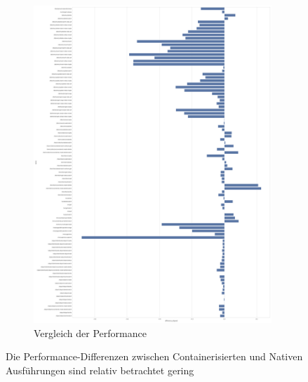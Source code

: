 \begin{figure}[h!]
    \centering
    \includegraphics[width=0.8\textwidth]{benchmark/vis/differences/difference_elapsed.png}
    \caption{Vergleich der Performance}
    \label{fig:comparison}
\end{figure}


Die Performance-Differenzen zwischen Containerisierten und Nativen Ausführungen sind relativ betrachtet gering 

\FloatBarrier





